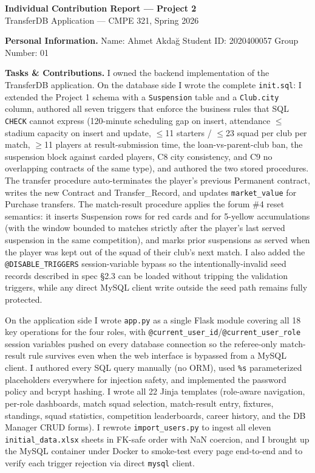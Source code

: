 \documentclass[12pt]{article}
\begin{document}
\begin{center}
\textbf{\large Individual Contribution Report --- Project 2}\\[4pt]
TransferDB Application --- CMPE 321, Spring 2026
\end{center}

\vspace{2pt}

\textbf{Personal Information.}
Name: Ahmet Akda\u{g} \quad Student ID: 2020400057 \quad Group Number: 01

\textbf{Tasks \& Contributions.}
I owned the backend implementation of the TransferDB application. On
the database side I wrote the complete \texttt{init.sql}: I extended
the Project 1 schema with a \texttt{Suspension} table and a
\texttt{Club.city} column, authored all seven triggers that enforce
the business rules that SQL \texttt{CHECK} cannot express
(120-minute scheduling gap on insert, attendance $\leq$ stadium
capacity on insert and update, $\leq$11 starters / $\leq$23 squad per
club per match, $\geq$11 players at result-submission time, the
loan-vs-parent-club ban, the suspension block against carded players,
C8 city consistency, and C9 no overlapping contracts of the same
type), and authored the two stored procedures. The transfer procedure
auto-terminates the player's previous Permanent contract, writes the
new Contract and Transfer\_Record, and updates \texttt{market\_value}
for Purchase transfers. The match-result procedure applies the forum
\#4 reset semantics: it inserts Suspension rows for red cards and for
5-yellow accumulations (with the window bounded to matches strictly
after the player's last served suspension in the same competition),
and marks prior suspensions as served when the player was kept out of
the squad of their club's next match. I also added the
\texttt{@DISABLE\_TRIGGERS} session-variable bypass so the
intentionally-invalid seed records described in spec \S2.3 can be
loaded without tripping the validation triggers, while any direct
MySQL client write outside the seed path remains fully protected.

On the application side I wrote \texttt{app.py} as a single Flask
module covering all 18 key operations for the four roles, with
\texttt{@current\_user\_id}/\texttt{@current\_user\_role} session
variables pushed on every database connection so the referee-only
match-result rule survives even when the web interface is bypassed
from a MySQL client. I authored every SQL query manually (no ORM),
used \texttt{\%s} parameterized placeholders everywhere for injection
safety, and implemented the password policy and bcrypt hashing. I
wrote all 22 Jinja templates (role-aware navigation, per-role
dashboards, match squad selection, match-result entry, fixtures,
standings, squad statistics, competition leaderboards, career
history, and the DB Manager CRUD forms). I rewrote
\texttt{import\_users.py} to ingest all eleven
\texttt{initial\_data.xlsx} sheets in FK-safe order with NaN
coercion, and I brought up the MySQL container under Docker to
smoke-test every page end-to-end and to verify each trigger
rejection via direct \texttt{mysql} client.
\end{document}

